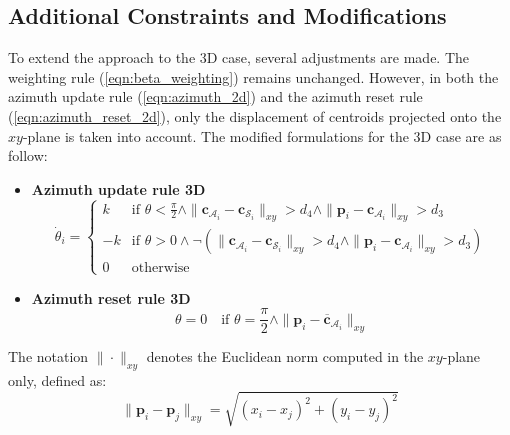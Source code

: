     \subsection{Additional Constraints and Modifications}
        To extend the approach to the 3D case, several adjustments are made.
        The weighting rule (\ref{eqn:beta_weighting}) remains unchanged. 
        However, in both the azimuth update rule (\ref{eqn:azimuth_2d}) and the azimuth reset rule (\ref{eqn:azimuth_reset_2d}), only the displacement of centroids projected onto the $xy$-plane is taken into account.
        The modified formulations for the 3D case are as follow:
        \begin{itemize}
            \item \textbf{Azimuth update rule 3D}
                \begin{equation}
                    \label{eqn:azimuth_3d}
                    \dot{\theta}_i = 
                    \begin{cases}
                        k  & \text{if } \theta < \frac{\pi}{2} \land \|\mathbf{c}_{\mathcal{A}_i} - \mathbf{c}_{\mathcal{S}_i}\|_{xy} > d_4 \land \|\mathbf{p}_i - \mathbf{c}_{\mathcal{A}_i}\|_{xy} > d_3 \\
                        -k & \text{if } \theta > 0 \land \neg (\|\mathbf{c}_{\mathcal{A}_i} - \mathbf{c}_{\mathcal{S}_i}\|_{xy} > d_4 \land \|\mathbf{p}_i - \mathbf{c}_{\mathcal{A}_i}\|_{xy} > d_3) \\
                        0  & \text{otherwise}
                    \end{cases}
                \end{equation}
            \item \textbf{Azimuth reset rule 3D}
                \begin{equation}
                    \label{eqn:azimuth_reset_3d}
                    \theta = 0 \quad \text{if } \theta = \frac{\pi}{2} \land \| \mathbf{p}_i - \mathbf{\overline{c}}_{\mathcal{A}_i} \|_{xy}    
                \end{equation}
        \end{itemize}

        The notation $\| \cdot \|_{xy}$ denotes the Euclidean norm computed in the $xy$-plane only, defined as:
        \begin{equation}
            \| \mathbf{p}_i - \mathbf{p}_j \|_{xy} = \sqrt{(x_i - x_j)^2 + (y_i - y_j)^2}
        \end{equation}



